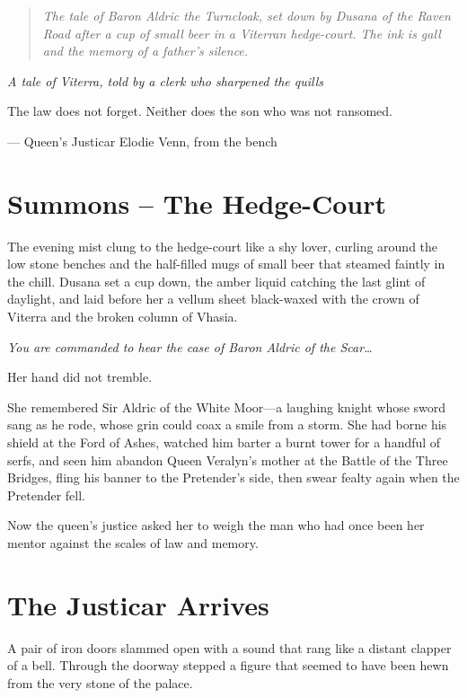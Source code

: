 \documentclass[11pt,twoside]{book}
\newenvironment{quotebox}
{\begin{quote}\small\itshape}
{\end{quote}}
\begin{document}
\begin{quotebox}
\textit{The tale of Baron Aldric the Turncloak, set down by Dusana of the Raven Road after a cup of small beer in a Viterran hedge-court. The ink is gall and the memory of a father's silence.}
\end{quotebox}

\vspace{2cm}
\begin{center}
\textit{A tale of Viterra, told by a clerk who sharpened the quills}
\end{center}
\vspace{1cm}

\epigraph{The law does not forget. Neither does the son who was not ransomed.}{--- Queen's Justicar Elodie Venn, from the bench}

\section*{Summons -- The Hedge-Court}

The evening mist clung to the hedge-court like a shy lover, curling around the low stone benches and the half-filled mugs of small beer that steamed faintly in the chill.  
Dusana set a cup down, the amber liquid catching the last glint of daylight, and laid before her a vellum sheet black-waxed with the crown of Viterra and the broken column of Vhasia.  

\bigskip
\textit{You are commanded to hear the case of Baron Aldric of the Scar\dots}  

\bigskip
Her hand did not tremble.

She remembered Sir Aldric of the White Moor---a laughing knight whose sword sang as he rode, whose grin could coax a smile from a storm. She had borne his shield at the Ford of Ashes, watched him barter a burnt tower for a handful of serfs, and seen him abandon Queen Veralyn's mother at the Battle of the Three Bridges, fling his banner to the Pretender's side, then swear fealty again when the Pretender fell.  

Now the queen's justice asked her to weigh the man who had once been her mentor against the scales of law and memory.  

\newpage

\section*{The Justicar Arrives}

A pair of iron doors slammed open with a sound that rang like a distant clapper of a bell.  
Through the doorway stepped a figure that seemed to have been hewn from the very stone of the palace.  
\end{document}
